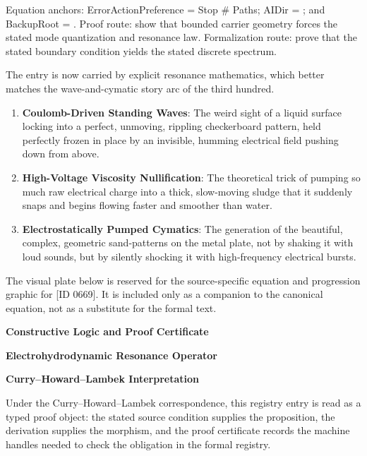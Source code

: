 Equation anchors: ErrorActionPreference = Stop \# Paths; AIDir = ; and BackupRoot = . Proof route: show that bounded carrier geometry forces the stated mode quantization and resonance law. Formalization route: prove that the stated boundary condition yields the stated discrete spectrum.

The entry is now carried by explicit resonance mathematics, which better matches the wave-and-cymatic story arc of the third hundred.
\endgroup

\begin{enumerate}[leftmargin=1.6em,itemsep=6pt,topsep=4pt]
\item \textbf{Coulomb-Driven Standing Waves}: The weird sight of a liquid surface locking into a perfect, unmoving, rippling checkerboard pattern, held perfectly frozen in place by an invisible, humming electrical field pushing down from above.
\item \textbf{High-Voltage Viscosity Nullification}: The theoretical trick of pumping so much raw electrical charge into a thick, slow-moving sludge that it suddenly snaps and begins flowing faster and smoother than water.
\item \textbf{Electrostatically Pumped Cymatics}: The generation of the beautiful, complex, geometric sand-patterns on the metal plate, not by shaking it with loud sounds, but by silently shocking it with high-frequency electrical bursts.
\end{enumerate}

\begingroup\footnotesize\sloppy
The visual plate below is reserved for the source-specific equation and progression graphic for [ID 0669]. It is included only as a companion to the canonical equation, not as a substitute for the formal text.
\par\endgroup
\ifTZPDarkEdition
{}
\fi

\clearpage
\begingroup\tzpsupportsetup
\noindent\textbf{\fontsize{10.8pt}{12.8pt}\selectfont [ID 0669] Constructive Logic and Proof Certificate}\par
\noindent\textbf{\fontsize{10pt}{12pt}\selectfont Electrohydrodynamic Resonance Operator}\par
\vspace{0.45em}
\begingroup
\footnotesize
\setlength{\parskip}{0.22em}
\setlength{\parindent}{0pt}
\noindent\textbf{Curry--Howard--Lambek Interpretation}\par
Under the Curry--Howard--Lambek correspondence, this registry entry is read as a typed proof
object: the stated source condition supplies the proposition, the derivation supplies the
morphism, and the proof certificate records the machine handles needed to check the obligation
in the formal registry.

